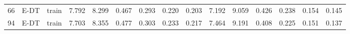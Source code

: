 \begin{table}
\begin{tabular}{@{\hskip3pt}c@{\hskip3pt}c@{\hskip3pt}c@{\hskip3pt}c@{\hskip3pt}c@{\hskip3pt}c@{\hskip3pt}c@{\hskip3pt}c@{\hskip3pt}c@{\hskip3pt}c@{\hskip3pt}c@{\hskip3pt}c@{\hskip3pt}c@{\hskip3pt}c@{\hskip3pt}c}
         66 &           E-DT &                     train &             7.792 &       8.299 &         0.467 &       0.293 &       0.220 &        0.203 &               7.192 &       9.059 &         0.426 &       0.238 &       0.154 &        0.145 \\
         94 &           E-DT &                     train &             7.703 &       8.355 &         0.477 &       0.303 &       0.233 &        0.217 &               7.464 &       9.191 &         0.408 &       0.225 &       0.151 &        0.137 \\
\bottomrule
\end{tabular}
\end{table}

